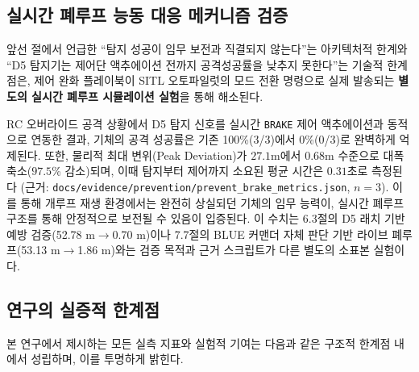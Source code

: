 \subsection{실시간 폐루프 능동 대응 메커니즘 검증}
\label{subsec:closed_loop_prevention}

\noindent 앞선 절에서 언급한 ``탐지 성공이 임무 보전과 직결되지 않는다''는 아키텍처적 한계와 ``D5 탐지기는 제어단 액추에이션 전까지 공격성공률을 낮추지 못한다''는 기술적 한계점은, 제어 완화 플레이북이 SITL 오토파일럿의 모드 전환 명령으로 실제 발송되는 \textbf{별도의 실시간 폐루프 시뮬레이션 실험}을 통해 해소된다.

RC 오버라이드 공격 상황에서 D5 탐지 신호를 실시간 \texttt{BRAKE} 제어 액추에이션과 동적으로 연동한 결과, 기체의 공격 성공률은 기존 100\%(3/3)에서 0\%(0/3)로 완벽하게 억제된다. 또한, 물리적 최대 변위(Peak Deviation)가 $27.1$m에서 $0.68$m 수준으로 대폭 축소($97.5$\% 감소)되며, 이때 탐지부터 제어까지 소요된 평균 시간은 $0.31$초로 측정된다 (근거: \texttt{docs/evidence/prevention/prevent\_brake\_metrics.json}, $n=3$). 이를 통해 개루프 재생 환경에서는 완전히 상실되던 기체의 임무 능력이, 실시간 폐루프 구조를 통해 안정적으로 보전될 수 있음이 입증된다. 이 수치는 6.3절의 D5 래치 기반 예방 검증(52.78 m$\to$0.70 m)이나 7.7절의 BLUE 커맨더 자체 판단 기반 라이브 폐루프(53.13 m$\to$1.86 m)와는 검증 목적과 근거 스크립트가 다른 별도의 소표본 실험이다.

\subsection{연구의 실증적 한계점}
\label{subsec:limitations}

\noindent 본 연구에서 제시하는 모든 실측 지표와 실험적 기여는 다음과 같은 구조적 한계점 내에서 성립하며, 이를 투명하게 밝힌다.

